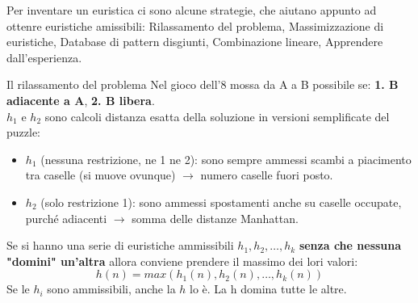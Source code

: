 Per inventare un euristica ci sono alcune strategie, che aiutano appunto ad ottenre euristiche amissibili: Rilassamento del problema, 
Massimizzazione di euristiche, Database di pattern disgiunti, Combinazione lineare, Apprendere dall’esperienza.
\begin{example}
    Il rilassamento del problema Nel gioco dell’8 mossa da A a B possibile se: \textbf{1. B adiacente a A}, \textbf{2. B libera}.\\
    $h_1$ e $h_2$ sono calcoli distanza esatta della soluzione in versioni semplificate del puzzle:
    \begin{itemize}
        \item $h_1$ (nessuna restrizione, ne 1 ne 2): sono sempre ammessi scambi a piacimento tra caselle (si muove
        ovunque) $\to$ numero caselle fuori posto.
        \item  $h_2$ (solo restrizione 1): sono ammessi spostamenti anche su caselle occupate, purché adiacenti $\to$ somma delle distanze Manhattan.
    \end{itemize}
\end{example}
\hspace{-15pt}Se si hanno una serie di euristiche ammissibili $h_1, h_2, \dots, h_k$ \textbf{senza che nessuna "domini" un'altra}
allora conviene prendere il massimo dei lori valori:
$$h(n) = max(h_1(n), h_2(n), \dots, h_k(n))$$
Se le $h_i$ sono ammissibili, anche la $h$ lo è. La h domina tutte le altre.

